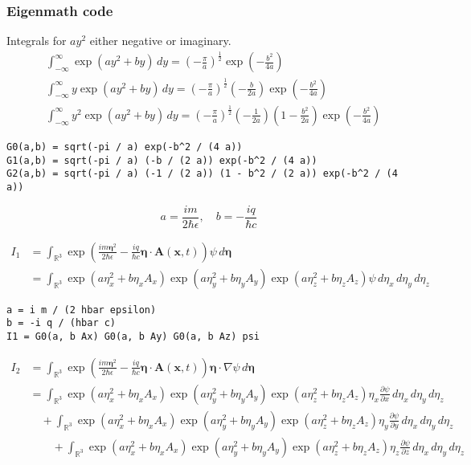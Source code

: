 \subsubsection*{Eigenmath code}

Integrals for $ay^2$ either negative or imaginary.
\begin{align*}
&\int_{-\infty}^\infty\exp(ay^2+by)\,dy
=\left(-\frac{\pi}{a}\right)^\frac{1}{2}
\exp\left(-\frac{b^2}{4a}\right)
\\
&\int_{-\infty}^\infty y\exp(ay^2+by)\,dy
=\left(-\frac{\pi}{a}\right)^\frac{1}{2}
\left(-\frac{b}{2a}\right)
\exp\left(-\frac{b^2}{4a}\right)
\\
&\int_{-\infty}^\infty y^2\exp(ay^2+by)\,dy
=\left(-\frac{\pi}{a}\right)^\frac{1}{2}
\left(-\frac{1}{2a}\right)
\left(1-\frac{b^2}{2a}\right)
\exp\left(-\frac{b^2}{4a}\right)
\end{align*}

{\footnotesize\begin{verbatim}
G0(a,b) = sqrt(-pi / a) exp(-b^2 / (4 a))
G1(a,b) = sqrt(-pi / a) (-b / (2 a)) exp(-b^2 / (4 a))
G2(a,b) = sqrt(-pi / a) (-1 / (2 a)) (1 - b^2 / (2 a)) exp(-b^2 / (4 a))
\end{verbatim}}

\begin{equation*}
a=\frac{im}{2\hbar\epsilon},\quad
b=-\frac{iq}{\hbar c}
\end{equation*}

\begin{align*}
I_1&=\int_{\mathbb R^3}
\exp\left(\frac{im\boldsymbol\eta^2}{2\hbar\epsilon}
-\frac{iq}{\hbar c}\boldsymbol\eta\cdot\mathbf A(\mathbf x,t)\right)
\psi\,d\boldsymbol\eta
\\
&=\int_{\mathbb R^3}
\exp\left(a\eta_x^2+b\eta_xA_x\right)
\exp\left(a\eta_y^2+b\eta_yA_y\right)
\exp\left(a\eta_z^2+b\eta_zA_z\right)
\psi\,d\eta_x\,d\eta_y\,d\eta_z
\end{align*}

{\footnotesize\begin{verbatim}
a = i m / (2 hbar epsilon)
b = -i q / (hbar c)
I1 = G0(a, b Ax) G0(a, b Ay) G0(a, b Az) psi
\end{verbatim}}

\begin{align*}
I_2&=\int_{\mathbb R^3}
\exp\left(\frac{im\boldsymbol\eta^2}{2\hbar\epsilon}
-\frac{iq}{\hbar c}\boldsymbol\eta\cdot\mathbf A(\mathbf x,t)\right)
\boldsymbol\eta\cdot\nabla\psi
\,d\boldsymbol\eta
\\
&=\int_{\mathbb R^3}
\exp\left(a\eta_x^2+b\eta_xA_x\right)
\exp\left(a\eta_y^2+b\eta_yA_y\right)
\exp\left(a\eta_z^2+b\eta_zA_z\right)\eta_x\frac{\partial\psi}{\partial x}
\,d\eta_x\,d\eta_y\,d\eta_z
\\
&\quad{}+\int_{\mathbb R^3}
\exp\left(a\eta_x^2+b\eta_xA_x\right)
\exp\left(a\eta_y^2+b\eta_yA_y\right)
\exp\left(a\eta_z^2+b\eta_zA_z\right)\eta_y\frac{\partial\psi}{\partial y}
\,d\eta_x\,d\eta_y\,d\eta_z
\\
&\quad\quad{}+\int_{\mathbb R^3}
\exp\left(a\eta_x^2+b\eta_xA_x\right)
\exp\left(a\eta_y^2+b\eta_yA_y\right)
\exp\left(a\eta_z^2+b\eta_zA_z\right)\eta_z\frac{\partial\psi}{\partial z}
\,d\eta_x\,d\eta_y\,d\eta_z
\end{align*}

